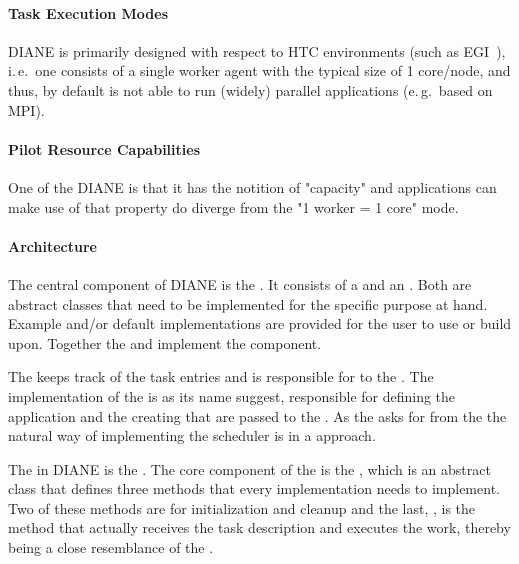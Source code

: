 \documentclass{sig-alternate}
\begin{document}
\paragraph{Task Execution Modes}
DIANE is primarily designed with respect to HTC environments (such as
EGI~\cite{egi}), i.\,e.\ one \pilot consists of a single worker agent with the
typical size of 1 core/node, and thus, by default is not able to run (widely)
parallel applications (e.\,g.\ based on MPI).

\paragraph{Pilot Resource Capabilities}
One of the DIANE  is that it has the notition
of "capacity" and applications can make use of that property do diverge from
the "1 worker = 1 core" mode.

\paragraph{Architecture}
The central component of DIANE is the .
It consists of a  and an .
Both are abstract classes that need to be implemented for the specific purpose
at hand. Example and/or default implementations are provided for the user to
use or build upon.
Together the  and  implement
the  component.

The  keeps track of the task entries and is responsible
for  to the .
The implementation of the  is as its name suggest,
responsible for defining the application  and the creating
 that are passed to the .
As the  asks for  from the
 the natural way of implementing the scheduler is in a
 approach.

The \vocab{\pilot} in DIANE is the .
The core component of the  is the
, which is an abstract class that defines three
methods that every implementation needs to implement.
Two of these methods are for initialization and cleanup and the last,
, is the method that actually receives the task description
and executes the work, thereby being a close resemblance of the .
\end{document}
